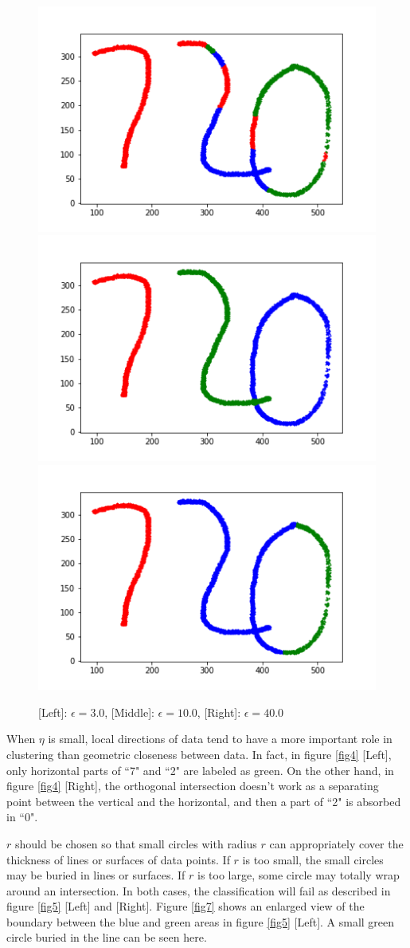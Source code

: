 \documentclass[twoside,11pt]{article}
\begin{document}
\begin{figure}[htbp]
\centering
\vspace{-1em}
\hspace{-2em}
\includegraphics[width=0.37  \textwidth]{eps_small.png}
\hspace{-2em}
\includegraphics[width=0.37  \textwidth]{normal_720.png}
\hspace{-2em}
\includegraphics[width=0.37  \textwidth]{eps_large.png}
\hspace{-2em}
\vspace{-1em}
\caption{[Left]: $\epsilon = 3.0$,  [Middle]: $\epsilon = 10.0$,  [Right]: $\epsilon = 40.0$}
\label{fig6}
\end{figure}


When $\eta$ is small, local directions of data tend to have a more important role in clustering than geometric closeness between data.
In fact, in figure \ref{fig4} [Left], only horizontal parts of ``7" and ``2" are labeled as green. On the other hand, in figure \ref{fig4} [Right], the orthogonal intersection doesn't work as a separating point between the vertical and the horizontal, and then a part of ``2" is absorbed in ``0".

$r$ should be chosen so that small circles with radius $r$ can appropriately cover the thickness of lines or surfaces of data points. If $r$ is too small, the small circles may be buried in lines or surfaces. If $r$ is too large, some circle may totally wrap around an intersection. In both cases, the classification will fail as described in figure \ref{fig5} [Left] and [Right]. Figure \ref{fig7} shows an enlarged view of the boundary between the blue and green areas in figure \ref{fig5} [Left]. A small green circle buried in the line can be seen here.
\end{document}
